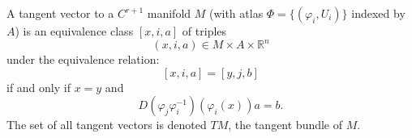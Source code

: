 A tangent vector to a $C^{r+1}$ manifold $M$ (with atlas $\Phi = \{(\varphi_i, U_i)\}$ indexed by $A$) is an equivalence class $[x,i,a]$ of triples
$$(x,i,a) \in M \times A \times \mathbb{R}^n$$
under the equivalence relation:
$$[x,i,a] = [y,j,b]$$
if and only if $x = y$ and
$$D(\varphi_j \varphi_i^{-1})(\varphi_i(x))a = b.$$
The set of all tangent vectors is denoted $TM$, the tangent bundle of $M$.
